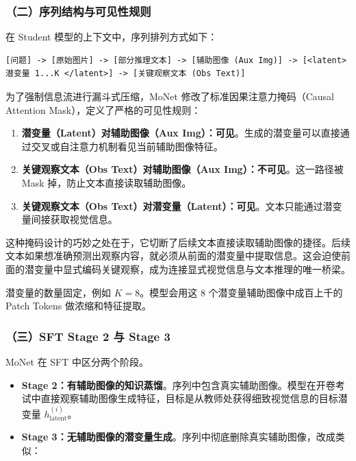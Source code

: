 \hypertarget{ux4e8cux5e8fux5217ux7ed3ux6784ux4e0eux53efux89c1ux6027ux89c4ux5219}{%
\subsubsection{（二）序列结构与可见性规则}\label{ux4e8cux5e8fux5217ux7ed3ux6784ux4e0eux53efux89c1ux6027ux89c4ux5219}}

在 Student 模型的上下文中，序列排列方式如下：

\begin{verbatim}
[问题] -> [原始图片] -> [部分推理文本] -> [辅助图像 (Aux Img)] -> [<latent> 潜变量 1...K </latent>] -> [关键观察文本 (Obs Text)]
\end{verbatim}

为了强制信息流进行漏斗式压缩，MoNet 修改了标准因果注意力掩码（Causal Attention Mask），定义了严格的可见性规则：

\begin{enumerate}
\def\labelenumi{\arabic{enumi}.}
\tightlist
\item
  \textbf{潜变量（Latent）对辅助图像（Aux Img）：可见}。生成的潜变量可以直接通过交叉或自注意力机制看见当前辅助图像特征。
\item
  \textbf{关键观察文本（Obs Text）对辅助图像（Aux Img）：不可见}。这一路径被 Mask 掉，防止文本直接读取辅助图像。
\item
  \textbf{关键观察文本（Obs Text）对潜变量（Latent）：可见}。文本只能通过潜变量间接获取视觉信息。
\end{enumerate}

这种掩码设计的巧妙之处在于，它切断了后续文本直接读取辅助图像的捷径。后续文本如果想准确预测出观察内容，就必须从前面的潜变量中提取信息。这会迫使前面的潜变量中显式编码关键观察，成为连接显式视觉信息与文本推理的唯一桥梁。

潜变量的数量固定，例如 \(K=8\)。模型会用这 8 个潜变量辅助图像中成百上千的 Patch Tokens 做浓缩和特征提取。

\hypertarget{ux4e09sft-stage-2-ux4e0e-stage-3}{%
\subsubsection{（三）SFT Stage 2 与 Stage 3}\label{ux4e09sft-stage-2-ux4e0e-stage-3}}

MoNet 在 SFT 中区分两个阶段。

\begin{itemize}
\tightlist
\item
  \textbf{Stage 2：有辅助图像的知识蒸馏}。序列中包含真实辅助图像。模型在开卷考试中直接观察辅助图像生成特征，目标是从教师处获得细致视觉信息的目标潜变量 \(h_{\text{latent}}^{(i)}\)。
\item
  \textbf{Stage 3：无辅助图像的潜变量生成}。序列中彻底删除真实辅助图像，改成类似：
\end{itemize}

